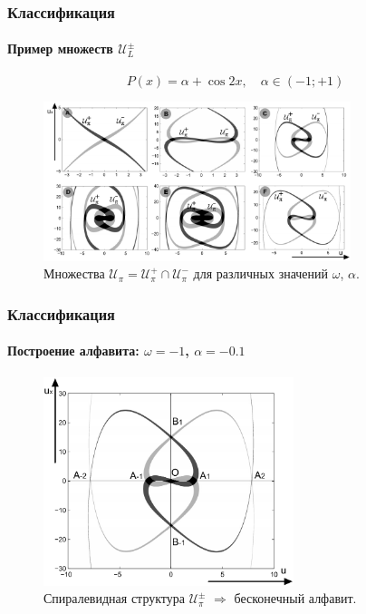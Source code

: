 \documentclass [10pt] {beamer}
\begin{document}
\begin{frame}
	\frametitle{Классификация}
	\framesubtitle{Пример множеств $\mathscr{U}_L^{\pm}$}
	$$P(x) = \alpha + \cos{2x}, \quad \alpha \in (-1; +1)$$
	\begin{figure}
		\includegraphics[width=0.8\textwidth]{pic/sets.pdf}
		\caption{Множества $\mathscr{U}_{\pi} = \mathscr{U}_{\pi}^+ \cap \mathscr{U}_{\pi}^-$ для различных значений $\omega$, $\alpha$.}
		\label{pic:sets}
	\end{figure}
\end{frame}

\begin{frame}
	\frametitle{Классификация}
	\framesubtitle{Построение алфавита: $\omega = -1$, $\alpha = -0.1$}
	\begin{figure}
		\includegraphics[width=0.65\textwidth]{pic/alphabet.pdf}
		\caption{Спиралевидная структура $\mathscr{U}_{\pi}^{\pm}$ $\Rightarrow$ бесконечный алфавит.}
		\label{pic:alphabet}
	\end{figure}
\end{frame}
\end{document}
